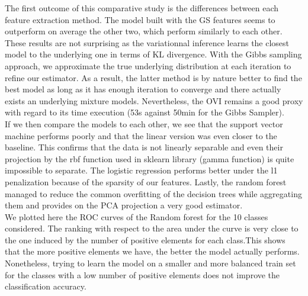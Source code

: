 \documentclass[twoside]{article}
\begin{document}
\begin{multicols}{2}
\noindent The first outcome of this comparative study is the differences between each feature extraction method. The model built with the GS features seems to outperform on average the other two, which perform similarly to each other. These results are not surprising as the variationnal inference learns the closest model to the underlying one in terms of KL divergence. With the Gibbs sampling approach, we approximate the true underlying distribution at each iteration to refine our estimator. As a result, the latter method is by nature better to find the best model as long as it has enough iteration to converge and there actually exists an underlying mixture models. Nevertheless, the OVI remains a good proxy with regard to its time execution (53s against 50min for the Gibbs Sampler).\\

\noindent If we then compare the models to each other, we see that the support vector machine performs poorly and that the linear version was even closer to the baseline. This confirms that the data is not linearly separable and even their projection by the rbf function used in sklearn library (gamma function) is quite impossible to separate. The logistic regression performs better under the l1 penalization because of the sparsity of our features. Lastly, the random forest managed to reduce the common overfitting of the decision trees while aggregating them and provides on the PCA projection a very good estimator.\\

\noindent We plotted here the ROC curves of the Random forest for the 10 classes considered. The ranking with respect to the area under the curve is very close to the one induced by the number of positive elements for each class.This shows that the more positive elements we have, the better the model actually performs. Nonetheless, trying to learn the model on a smaller and more balanced train set for the classes with a low number of positive elements does not improve the classification accuracy.


\end{multicols}
\end{document}
